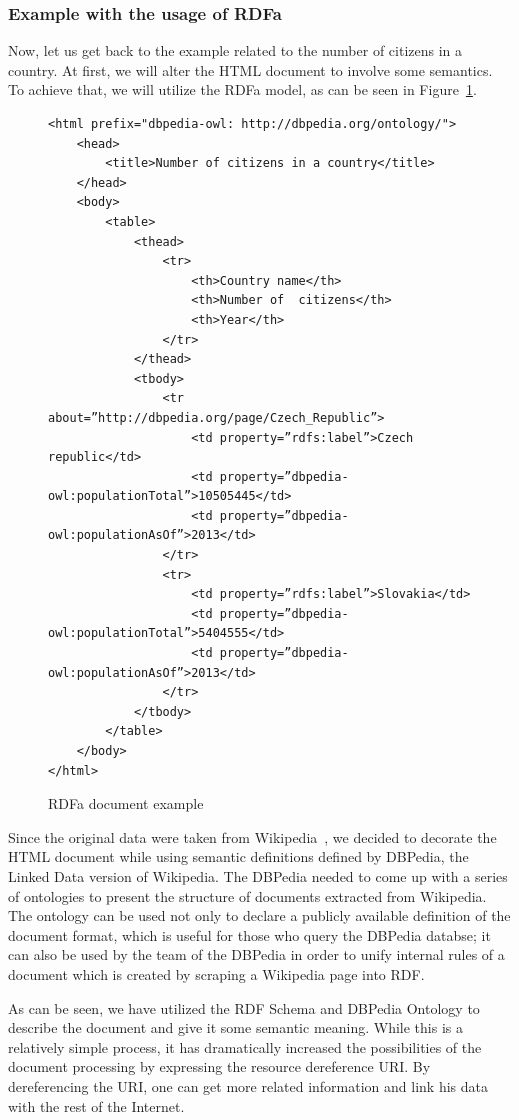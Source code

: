 \subsubsection{Example with the usage of RDFa}

Now, let us get back to the example related to the number of citizens in a country. At first, we
will alter the HTML document to involve some semantics. To achieve that, we will utilize the
RDFa model, as can be seen in Figure~\ref{fig:example-rdfa}.

\begin{figure}
\scriptsize\begin{verbatim}
<html prefix="dbpedia-owl: http://dbpedia.org/ontology/">
    <head>
        <title>Number of citizens in a country</title>
    </head>
    <body>
        <table>
            <thead>
                <tr>
                    <th>Country name</th>
                    <th>Number of  citizens</th>
                    <th>Year</th>
                </tr>
            </thead>
            <tbody>
                <tr about=”http://dbpedia.org/page/Czech_Republic”>
                    <td property=”rdfs:label”>Czech republic</td>
                    <td property=”dbpedia-owl:populationTotal”>10505445</td>
                    <td property=”dbpedia-owl:populationAsOf”>2013</td>
                </tr>
                <tr>
                    <td property=”rdfs:label”>Slovakia</td>
                    <td property=”dbpedia-owl:populationTotal”>5404555</td>
                    <td property=”dbpedia-owl:populationAsOf”>2013</td>
                </tr>
            </tbody>
        </table>
    </body>
</html>
\end{verbatim}\normalsize
\caption{RDFa document example}
\label{fig:example-rdfa}
\end{figure}

Since the original data were taken from Wikipedia~\cite{wikipedia}, we decided to decorate the HTML document
while using semantic definitions defined by DBPedia, the Linked Data version of Wikipedia. 
The DBPedia needed to come up with a series of ontologies to present the structure of documents
extracted from Wikipedia. The ontology can be used not only to declare a publicly available definition of 
the document format, which is useful for those who query the DBPedia databse; it 
can also be used by the team of the DBPedia in order to unify internal rules of 
a document which is created by scraping a Wikipedia page into RDF.

As can be seen, we have utilized the RDF Schema and DBPedia Ontology to describe the document
and give it some semantic meaning. While this is a relatively simple process, it has dramatically
increased the possibilities of the document processing by expressing the resource dereference URI.
By dereferencing the URI, one can get more related information and link his data with the rest
of the Internet.

